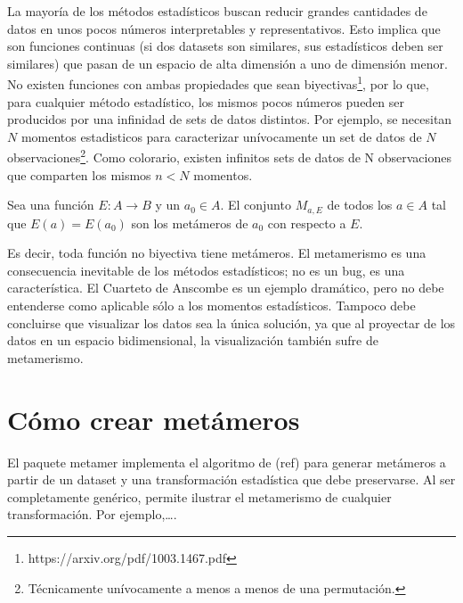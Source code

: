 \documentclass[runningheads,spanish]{llncs}
\begin{document}
La mayoría de los métodos estadísticos buscan reducir grandes cantidades
de datos en unos pocos números interpretables y representativos. Esto
implica que son funciones continuas (si dos datasets son similares, sus
estadísticos deben ser similares) que pasan de un espacio de alta
dimensión a uno de dimensión menor. No existen funciones con ambas
propiedades que sean
biyectivas\footnote{https://arxiv.org/pdf/1003.1467.pdf}, por lo que,
para cualquier método estadístico, los mismos pocos números pueden ser
producidos por una infinidad de sets de datos distintos. Por ejemplo, se
necesitan \(N\) momentos estadisticos para caracterizar unívocamente un
set de datos de \(N\)
observaciones\footnote{Técnicamente unívocamente a menos a menos de una permutación.}.
Como colorario, existen infinitos sets de datos de N observaciones que
comparten los mismos \(n < N\) momentos.

\begin{definition}
Sea una función $E : A \rightarrow B$ y un $a_0 \in A$. El conjunto $M_{a, E}$ de todos los $a \in A$ tal que $E(a) = E(a_0)$ son los metámeros de $a_0$ con respecto a $E$. 
\end{definition}

Es decir, toda función no biyectiva tiene metámeros. El metamerismo es
una consecuencia inevitable de los métodos estadísticos; no es un bug,
es una característica. El Cuarteto de Anscombe es un ejemplo dramático,
pero no debe entenderse como aplicable sólo a los momentos estadísticos.
Tampoco debe concluirse que visualizar los datos sea la única solución,
ya que al proyectar de los datos en un espacio bidimensional, la
visualización también sufre de metamerismo.

\section{Cómo crear metámeros}

El paquete metamer implementa el algoritmo de (ref) para generar
metámeros a partir de un dataset y una transformación estadística que
debe preservarse. Al ser completamente genérico, permite ilustrar el
metamerismo de cualquier transformación. Por ejemplo,\ldots{}.
%
%
%
% 

% 
%


\end{document}
